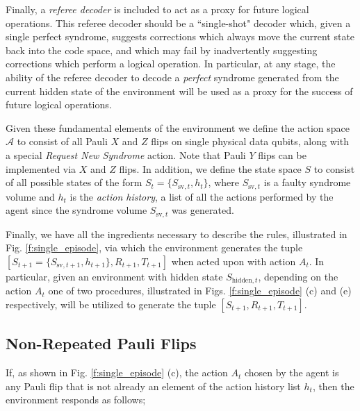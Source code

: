 \documentclass[twocolumn,preprintnumbers,amsmath,amssymb,notitlepage,nofootinbib,longbibliography,superscriptaddress,aps,pra,10pt]{revtex4-1}
\begin{document}
	Finally, a \emph{referee decoder} is included to act as a proxy for future logical operations.
	This referee decoder should be a ``single-shot" decoder which, given a single perfect syndrome, suggests corrections which always move the current state back into the code space, and which may fail by inadvertently suggesting corrections which perform a logical operation.
	In particular, at any stage, the ability of the referee decoder to decode a \emph{perfect} syndrome generated from the current hidden state of the environment will be used as a proxy for the success of future logical operations.

	Given these fundamental elements of the environment we define the action space $\mathcal{A}$ to consist of all Pauli $X$ and $Z$ flips on single physical data qubits, along with a special \emph{Request New Syndrome} action. 
	Note that Pauli $Y$ flips can be implemented via $X$ and $Z$ flips.
	In addition, we define the state space $S$ to consist of all possible states of the form $S_{t} = \{S_{\mathrm{sv},t},h_t\}$, where $S_{\mathrm{sv},t}$ is a faulty syndrome volume and $h_t$ is the \emph{action history}, a list of all the actions performed by the agent since the syndrome volume $S_{\mathrm{sv},t}$ was generated.

	Finally, we have all the ingredients necessary to describe the rules, illustrated in Fig. \ref{f:single_episode}, via which the environment generates the tuple $[S_{t+1} = \{S_{\mathrm{sv},t+1},h_{t+1}\},R_{t+1},T_{t+1}]$ when acted upon with action $A_t$.
	In particular, given an environment with hidden state $S_{\mathrm{hidden},t}$, depending on the action $A_t$ one of two procedures, illustrated in Figs. \ref{f:single_episode} (c) and (e) respectively, will be utilized to generate the tuple $[S_{t+1},R_{t+1},T_{t+1}]$.

	\subsection{Non-Repeated Pauli Flips}\label{s:non-repeated}

	If, as shown in Fi{}g. \ref{f:single_episode} (c), the action $A_t$ chosen by the agent is any Pauli flip that is not already an element of the action history list $h_t$, then the environment responds as follows;
\end{document}

